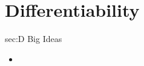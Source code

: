 \chapter{Differentiability}
\label{chap:D}

\begin{bigideas}{sec:D Big Ideas}
\begin{itemize}
  \item 
\end{itemize}
\end{bigideas}